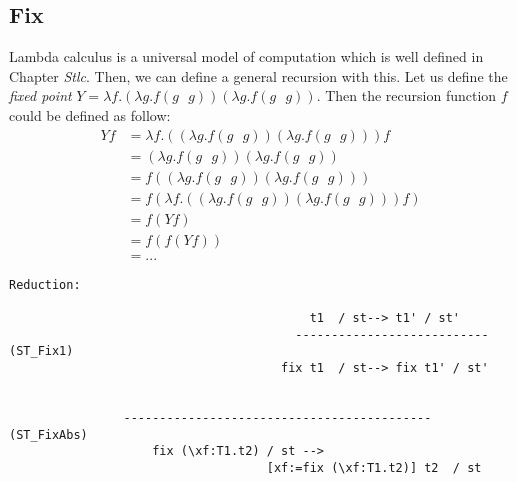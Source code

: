 \subsection{Fix}
Lambda calculus is a universal model of computation which is well defined in Chapter \textit{Stlc}. Then, we can define a general recursion with this. Let us define the \textit{fixed point} $Y = \lambda f. (\lambda g. f(g\text{ }g))(\lambda g. f(g\text{ }g))$. Then the recursion function $f$ could be defined as follow:
\begin{align*}
Yf &=  \lambda f. ((\lambda g. f(g\text{ }g))(\lambda g. f(g\text{ }g))) f \\
&=  (\lambda g. f(g\text{ }g))(\lambda g. f(g\text{ }g)) \\
&= f ((\lambda g. f(g\text{ }g))(\lambda g. f(g\text{ }g))) \\
&= f (\lambda f. ((\lambda g. f(g\text{ }g))(\lambda g. f(g\text{ }g))) f ) \\
&= f(Yf)\\
&= f(f(Yf))\\
&= ...
\end{align*}
\begin{lstlisting}
Reduction:

									      t1  / st--> t1' / st'
										---------------------------    (ST_Fix1)
									  fix t1  / st--> fix t1' / st'

				
				-------------------------------------------  (ST_FixAbs)
					fix (\xf:T1.t2) / st --> 
									[xf:=fix (\xf:T1.t2)] t2  / st
\end{lstlisting}

